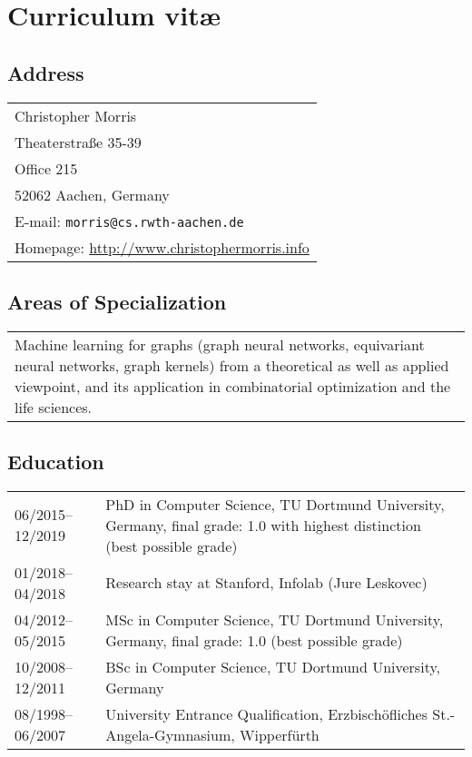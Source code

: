 \documentclass[11pt, a4paper, DIV=12]{scrartcl}
\begin{document}
\section*{\textcolor{upmaroon}{Curriculum vitæ}}
\vspace{-20pt}
\hrulefill
\subsection*{Address}
\noindent
\begin{tabular}{l}
Christopher Morris\\
Theaterstraße 35-39\\ 
Office 215\\ 
52062 Aachen, Germany\\
E-mail: \texttt{{morris@cs.rwth-aachen.de}} \\
Homepage: \url{http://www.christophermorris.info}\\
\end{tabular}

\subsection*{Areas of Specialization}
\noindent
\begin{tabular}{p{15.0cm}}
Machine learning for graphs (graph neural networks, equivariant neural networks, graph kernels) from a theoretical as well as applied viewpoint, and its application in combinatorial optimization and the life sciences.
\end{tabular}

\subsection*{Education}
\noindent
\begin{tabular}{p{3.0cm}p{11.5cm}}
	06/2015--12/2019&PhD in Computer Science, TU Dortmund University, Germany, final grade: 1.0 with highest distinction  (best possible grade)\\
	01/2018--04/2018& Research stay at Stanford, Infolab (Jure Leskovec)\\
	04/2012--05/2015&MSc in Computer Science, TU Dortmund University, Germany, final grade: 1.0 (best possible grade)\\
	10/2008--12/2011&BSc in Computer Science, TU Dortmund University, Germany\\
	08/1998--06/2007&University Entrance Qualification, Erzbisch\"ofliches St.-Angela-Gymnasium, Wipperf\"urth\\
\end{tabular}
\end{document}
